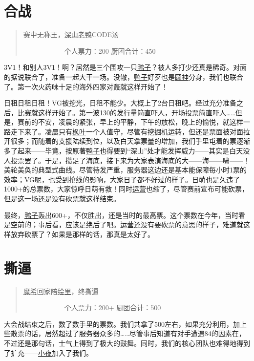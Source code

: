 \chapter{合战}
\begin{quote}
赛中无称王，\uline{深山老鸭}CODE汤

　　　　　　个人票力：200 厨团合计：450
\end{quote}

3V1！和别人3V1！啊？居然是三个围攻一只\uline{鸭子}？被人多打少还真是稀奇。对面的据说联合了，准备一起大干一场。没辙，\uline{鸭子}好歹也是\uline{圆神}分身，我们也联合了。第一次火药味十足的海外四家对轰就这样开始了！

日租日租日租！VG被挖光，日租不能少。大概上了2台日租吧。经过充分准备之后，比赛就这样开始了。第一波130的发行量简直吓人，开场投票简直吓人……但是，赛前的不安，凌晨的紧张，早上的平静，下午的放松，晚上的愉悦，就这样一路走下来了。凌晨只有\uline{枫叶}一个人值守，尽管有挖掘机运转，但还是票面被对面拉开很多；而随着的支援陆续到位，以及白天拿票量的增加，我们手里屯着的票逐渐多了起来——毕竟，按原著\uline{鸭子}也得要到“深山”处才能发挥威力——其实是白天没人投票罢了。于是，攒足了海底，接下来为大家表演海底的大——海——啸——！美轮美奂的典型式曲线。尽管待发严重，服务器这边还是基本能保障每小时1票的效率；VG呢，也受到抢线的影响，大家日子都不好过的样子。日萌也是久违了1000+的总票数，大家惊呼日萌有救！同时\uline{运营}也缩了，尽管赛前宣布可能砍票，但是这一场还是没有砍票就这样结束。

最终，\uline{鸭子}轰出600+，不仅胜出，还是当时的最高票。这个票数在今年，当时看是空前的；事后看，应该是绝后了吧。\uline{运营}还没有要砍票的意思的样子，难道就这样放弃砍票了？如果是那样的话，那真是太好了。

\chapter{撕逼}
\begin{quote}
\uline{魔希}回家陪\uline{绘里}，终撕逼

　　　　　　个人票力：200+ 厨团合计：500
\end{quote}

大会战结束之后，数了数手里的票数。我们共拿了500左右，如果充分利用，加上些散票的话，居然超过了服务器众多的……尽管事后知道有对手遭遇84的因素在，不过还是那句话，士气上得到了极大的鼓舞。同时，我们的核心团队也难得地得到了扩充——\uline{小夜}加入了我们。

